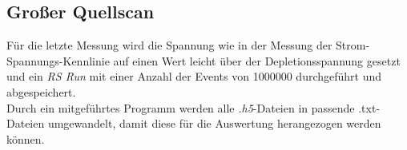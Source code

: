 \subsection{Großer Quellscan}
\label{sec:Quellscan}
Für die letzte Messung wird die Spannung wie in der Messung der Strom-Spannungs-Kennlinie auf einen Wert leicht über der Depletionsspannung gesetzt und ein \textit{RS Run} mit einer Anzahl der Events von \num{1000000} durchgeführt und abgespeichert.\\

Durch ein mitgeführtes Programm werden alle \textit{.h5}-Dateien in passende .txt-Dateien
umgewandelt, damit diese für die Auswertung herangezogen werden können.
